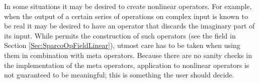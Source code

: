 In some situations it may be desired to create nonlinear
operators. For example, when the output of a certain series of
operations on complex input is known to be real it may be desired to
have an operator that discards the imaginary part of its input. While
\spot{} permits the construction of such operators (see the
 field in Section \ref{Sec:SparcoOpFieldLinear}),
utmost care has to be taken when using them in combination with meta
operators. Because there are no sanity checks in the implementation of
the meta operators, application to nonlinear operators is not
guaranteed to be meaningful; this is something the user should
decide.


